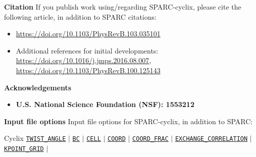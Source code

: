\begin{frame}[allowframebreaks]{\textbf{Citation}} \label{Citation}
If you publish work using/regarding SPARC-cyclix, please cite the following article, in addition to SPARC citations:
\begin{itemize}
    \item \url{https://doi.org/10.1103/PhysRevB.103.035101}
    \item Additional references for initial developments: \url{https://doi.org/10.1016/j.jmps.2016.08.007}, \url{https://doi.org/10.1103/PhysRevB.100.125143}
\end{itemize}
\end{frame}


\begin{frame}[allowframebreaks]{\textbf{Acknowledgements}} \label{Acknowledgements}
\begin{itemize}
    \item \textbf{U.S. National Science Foundation (NSF): 1553212 
        } \\
\end{itemize}
\end{frame}


\begin{frame}[allowframebreaks]{\textbf{Input file options}} \label{Index}
\vspace{-2mm}
Input file options for SPARC-cyclix, in addition to SPARC:
 \begin{block}{Cyclix}
\hyperlink{TWIST_ANGLE}{\texttt{TWIST\_ANGLE}} $\vert$ 
\hyperlink{BC}{\texttt{BC}} $\vert$ 
\hyperlink{CELL}{\texttt{CELL}}  $\vert$ 
\hyperlink{COORD}{\texttt{COORD}}  $\vert$ 
\hyperlink{COORD_FRAC}{\texttt{COORD\_FRAC}}  $\vert$ 
\hyperlink{EXCHANGE_CORRELATION}{\texttt{EXCHANGE\_CORRELATION}} $\vert$ 
\hyperlink{KPOINT_GRID}{\texttt{KPOINT\_GRID}} $\vert$ 

\end{block}
\end{frame}









